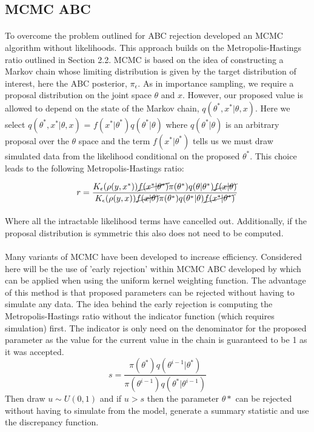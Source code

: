 \documentclass[12,fleqn]{article}
\theoremstyle{definition}
\theoremstyle{plain}
\begin{document}
\subsection{MCMC ABC}
\paragraph{}
To overcome the problem outlined for ABC rejection \cite{marjoram} developed an MCMC algorithm without likelihoods. This approach builds on the Metropolis-Hastings ratio outlined in Section 2.2. MCMC is based on the idea of constructing a Markov chain whose limiting distribution is given by the target distribution of interest, here the ABC posterior, $\pi_\epsilon$. As in importance sampling, we require a proposal distribution on the joint space $\theta$ and $x$. However, our proposed value is allowed to depend on the state of the Markov chain, $q(\theta^*, x^* | \theta, x)$. Here we select $q(\theta^*, x^* | \theta, x)$ = $f(x^* | \theta^*)q(\theta^* | \theta)$ where $q(\theta^* | \theta)$ is an arbitrary proposal over the $\theta$ space and the term $f(x^* | \theta^*)$ tells us we must draw simulated data from the likelihood conditional on the proposed $\theta^*$. This choice leads to the following Metropolis-Hastings ratio:
\par
\begin{equation*}
r= \frac{K_\epsilon(\rho(y,x^*))\cancel{f(x^* | \theta^*)}\pi(\theta^*)q(\theta|\theta^*)\cancel{f(x|\theta)}}{K_\epsilon(\rho(y,x))\cancel{f(x| \theta)}\pi(\theta^*)q(\theta^*|\theta)\cancel{f(x^*|\theta^*)}}
\end{equation*}
\paragraph{}
Where all the intractable likelihood terms have cancelled out. Additionally, if the proposal distribution is symmetric this also does not need to be computed. 
\par
\paragraph{}
Many variants of MCMC have been developed to increase efficiency. Considered here will be the use of 'early rejection' within MCMC ABC developed by  which can be applied when using the uniform kernel weighting function. The advantage of this method is that proposed parameters can be rejected without having to simulate any data. The idea behind the early rejection is computing the Metropolis-Hastings ratio without the indicator function (which requires simulation) first. The indicator is only need on the denominator for the proposed parameter as the value for the current value in the chain is guaranteed to be 1 as it was accepted.
\begin{equation*}
s = \frac{\pi(\theta^*) q(\theta^{i - 1} | \theta^*)}{\pi(\theta^{i - 1}) q(\theta^* | \theta^{i - 1})}
\end{equation*}
Then draw $u \sim U(0,1)$ and if $u > s$ then the parameter $\theta*$ can be rejected without having to simulate from the model, generate a summary statistic and use the discrepancy function.
\par
\end{document}
